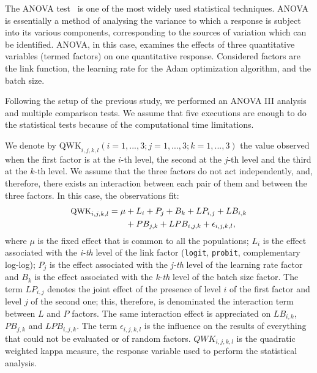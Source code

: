 \documentclass[journal]{IEEEtran}
\begin{document}
	The ANOVA test~\cite{miller1997beyond} is one of the most widely used statistical techniques. ANOVA is essentially a method of analysing the variance to which a response is subject into its various components, corresponding to the sources of variation which can be identified. ANOVA, in this case, examines the effects of three quantitative variables (termed factors) on one quantitative response. Considered factors are the link function, the learning rate for the Adam optimization algorithm, and the batch size. 
	
	Following the setup of the previous study, we performed an ANOVA III analysis and multiple comparison tests. We assume that five executions are enough to do the statistical tests because of the computational time limitations.
	
	We denote by $\text{QWK}_{i,j,k,l}(i=1, ..., 3; j = 1, ..., 3; k = 1, ..., 3)$ the value observed when the first factor is at the $i$-th level, the second at the $j$-th level and the third at the $k$-th level. We assume that the three factors do not act independently, and, therefore, there exists an interaction between each pair of them and between the three factors. In this case, the observations fit:
	\begin{equation}
	\nonumber
	\begin{aligned}
	\footnotesize
	\text{QWK}_{i,j,k,l} = \mu & + L_i + P_j + B_k + LP_{i,j} + LB_{i,k} \\& + PB_{j,k} + LPB_{i,j,k} + \epsilon_{i,j,k,l},
	\label{eq:anova3}
	\end{aligned}
	\end{equation}
	where $\mu$ is the fixed effect that is common to all the populations; $L_i$ is the effect associated with the \textit{i-th} level of the link factor (\texttt{logit}, \texttt{probit}, complementary log-log); $P_j$ is the effect associated with the \textit{j-th} level of the learning rate factor and $B_k$ is the effect associated with the \textit{k-th} level of the batch size factor. The term $LP_{i,j}$ denotes the joint effect of the presence of level $i$ of the first factor and level $j$ of the second one; this, therefore, is denominated the interaction term between $L$ and $P$ factors. The same interaction effect is appreciated on $LB_{i,k}$, $PB_{j,k}$ and $LPB_{i,j,k}$. The term $\epsilon_{i,j,k,l}$ is the influence on the results of everything that could not be evaluated or of random factors. $QWK_{i,j,k,l}$ is the quadratic weighted kappa measure, the response variable used to perform the statistical analysis.
	
\end{document}
